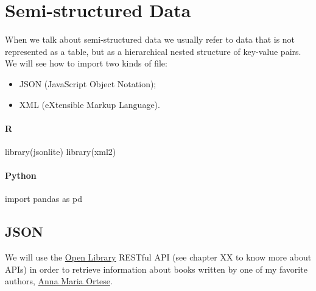 \documentclass[
  letterpaper,
  DIV=11,
  numbers=noendperiod]{scrreprt}
\newenvironment{Shaded}{\begin{snugshade}}{\end{snugshade}}
\newcommand{\FunctionTok}[1]{\textcolor[rgb]{0.28,0.35,0.67}{#1}}
\newcommand{\ImportTok}[1]{\textcolor[rgb]{0.00,0.46,0.62}{#1}}
\newcommand{\NormalTok}[1]{\textcolor[rgb]{0.00,0.46,0.62}{#1}}
\providecommand{\tightlist}{%
  \setlength{\itemsep}{0pt}\setlength{\parskip}{0pt}}
\begin{document}
\hypertarget{semi-structured-data}{%
\chapter{Semi-structured Data}\label{semi-structured-data}}

When we talk about semi-structured data we usually refer to data that is
not represented as a table, but as a hierarchical nested structure of
key-value pairs. We will see how to import two kinds of file:

\begin{itemize}
\tightlist
\item
  JSON (JavaScript Object Notation);
\item
  XML (eXtensible Markup Language).
\end{itemize}

\hypertarget{r-6}{%
\subsubsection{R}\label{r-6}}

\begin{Shaded}
\begin{Highlighting}[]
\FunctionTok{library}\NormalTok{(jsonlite)}
\FunctionTok{library}\NormalTok{(xml2)}
\end{Highlighting}
\end{Shaded}

\hypertarget{python-6}{%
\subsubsection{Python}\label{python-6}}

\begin{Shaded}
\begin{Highlighting}[]
\ImportTok{import}\NormalTok{ pandas }\ImportTok{as}\NormalTok{ pd}
\end{Highlighting}
\end{Shaded}

\hypertarget{json}{%
\section{JSON}\label{json}}

We will use the \href{https://openlibrary.org/}{Open Library} RESTful
API (see chapter XX to know more about APIs) in order to retrieve
information about books written by one of my favorite authors,
\href{https://en.wikipedia.org/wiki/Anna_Maria_Ortese}{Anna Maria
Ortese}.
\end{document}
